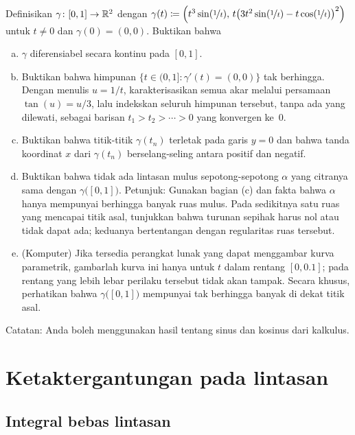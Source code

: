 \begin{exercise}
Definisikan $\gamma \colon [0,1] \to {\mathbb{R}}^2$ dengan
$\gamma(t) \coloneqq \Bigl( t^3 \sin(\nicefrac{1}{t}),\,
t{\bigl(3t^2\sin(\nicefrac{1}{t})-t\cos(\nicefrac{1}{t})\bigr)}^2 \Bigr)$
untuk
$t \neq 0$ dan $\gamma(0) = (0,0)$. Buktikan bahwa
\begin{enumerate}[a)]
\item
$\gamma$ diferensiabel secara kontinu pada $[0,1]$.
\item
Buktikan bahwa himpunan
$\{t\in(0,1] : \gamma'(t)=(0,0)\}$ tak berhingga. Dengan menulis $u=1/t$,
karakterisasikan semua akar melalui persamaan $\tan(u)=u/3$, lalu indekskan
seluruh himpunan tersebut, tanpa ada yang dilewati, sebagai barisan
$t_1>t_2>\cdots>0$ yang konvergen ke~$0$.
\item
Buktikan bahwa titik-titik $\gamma(t_n)$ terletak pada garis $y=0$ dan bahwa
tanda koordinat $x$ dari $\gamma(t_n)$ berselang-seling antara positif dan
negatif.
\item
Buktikan bahwa tidak ada lintasan mulus sepotong-sepotong $\alpha$ yang citranya
sama dengan $\gamma\bigl([0,1]\bigr)$. Petunjuk: Gunakan bagian (c) dan fakta
bahwa $\alpha$ hanya mempunyai berhingga banyak ruas mulus. Pada sedikitnya satu
ruas yang mencapai titik asal, tunjukkan bahwa turunan sepihak harus nol atau
tidak dapat ada; keduanya bertentangan dengan regularitas ruas tersebut.
\item
(Komputer) Jika tersedia perangkat lunak yang dapat menggambar kurva parametrik,
gambarlah kurva ini hanya untuk $t$ dalam rentang $[0,0.1]$; pada
rentang yang lebih lebar perilaku tersebut tidak akan tampak. Secara khusus,
perhatikan bahwa $\gamma\bigl([0,1]\bigr)$ mempunyai tak berhingga banyak
di dekat titik asal.
\end{enumerate}
Catatan: Anda boleh menggunakan hasil tentang sinus dan kosinus dari kalkulus.
\end{exercise}


\sectionnewpage
\section{Ketaktergantungan pada lintasan}
\label{sec:pathind}



\subsection{Integral bebas lintasan}

